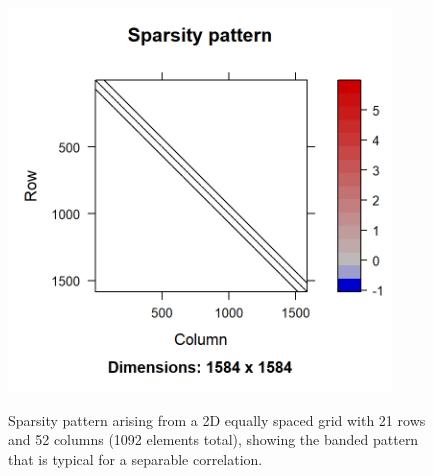 \begin{figure}[!ht] 
    \caption[Sparsity pattern for 2D autoregressive spatial GLMM]{Sparsity pattern arising from a 2D equally spaced grid with 21 rows and 52 columns (1092 elements total), showing the banded pattern that is typical for a separable correlation.}
    \centering
    \includegraphics[width=4in]{Chap_5/Hessian.png}
    \label{fig:Chap5_Hessian}
\end{figure}

